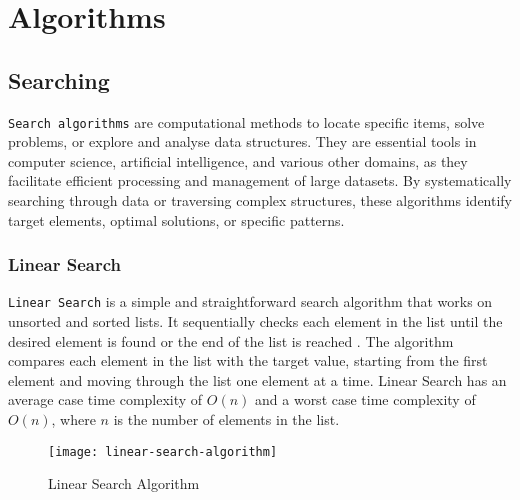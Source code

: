 


\section{Algorithms}




\subsection{Searching}

\lstinline{Search algorithms} are computational methods to locate specific items, solve problems, or explore and analyse data structures. They are essential tools in computer science, artificial intelligence, and various other domains, as they facilitate efficient processing and management of large datasets. By systematically searching through data or traversing complex structures, these algorithms identify target elements, optimal solutions, or specific patterns.

\subsubsection{Linear Search}
\lstinline{Linear Search} is a simple and straightforward search algorithm that works on unsorted and sorted lists. It sequentially checks each element in the list until the desired element is found or the end of the list is reached \cite{shaalaa_linear_search}. The algorithm compares each element in the list with the target value, starting from the first element and moving through the list one element at a time. Linear Search has an average case time complexity of $O(n)$ and a worst case time complexity of $O(n)$, where $n$ is the number of elements in the list.

\begin{figure}[htbp]
    \centering
    \texttt{[image: linear-search-algorithm]}
    \caption{Linear Search Algorithm \cite{ravikiran_linear_search}}
    \label{fig:linear-search-algorithm}
\end{figure}

